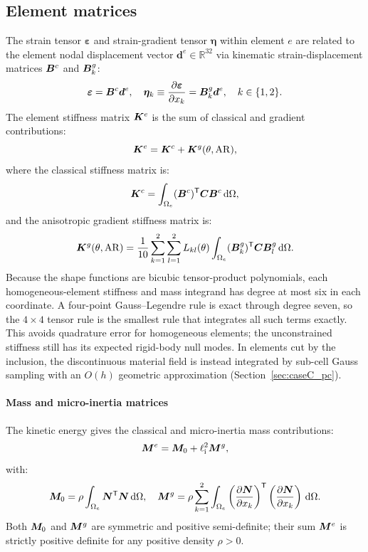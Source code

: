 \subsection{Element matrices}
The strain tensor $\bm\varepsilon$ and strain-gradient tensor $\bm\eta$ within element $e$ are related to the element nodal displacement vector $\bm{d}^e \in \mathbb{R}^{32}$ via kinematic strain-displacement matrices $\bm{B}^c$ and $\bm{B}^g_k$:
\begin{equation}
\bm\varepsilon = \bm{B}^c \bm{d}^e, \quad \bm\eta_k \equiv \frac{\partial \bm\varepsilon}{\partial x_k} = \bm{B}^g_k \bm{d}^e, \quad k \in \{1, 2\}.
\label{eq:strain_matrices}
\end{equation}
The element stiffness matrix $\bm{K}^e$ is the sum of classical and gradient contributions:
\begin{equation}
\bm{K}^e = \bm{K}^c + \bm{K}^g(\theta, \mathrm{AR}),
\label{eq:Ke_total}
\end{equation}
where the classical stiffness matrix is:
\begin{equation}
\bm{K}^c = \int_{\Omega_e} (\bm{B}^c)^\mathsf{T} \bm{C} \bm{B}^c \,\mathrm{d}\Omega,
\label{eq:Kc_int}
\end{equation}
and the anisotropic gradient stiffness matrix is:
\begin{equation}
\bm{K}^g(\theta, \mathrm{AR}) = \frac{1}{10} \sum_{k=1}^2 \sum_{l=1}^2 L_{kl}(\theta) \int_{\Omega_e} (\bm{B}^g_k)^\mathsf{T} \bm{C} \bm{B}^g_l \,\mathrm{d}\Omega.
\label{eq:Kg_int}
\end{equation}
Because the shape functions are bicubic tensor-product polynomials, each homogeneous-element stiffness and mass integrand has degree at most six in each coordinate. A four-point Gauss--Legendre rule is exact through degree seven, so the $4 \times 4$ tensor rule is the smallest rule that integrates all such terms exactly. This avoids quadrature error for homogeneous elements; the unconstrained stiffness still has its expected rigid-body null modes. In elements cut by the inclusion, the discontinuous material field is instead integrated by sub-cell Gauss sampling with an $O(h)$ geometric approximation (Section~\ref{sec:caseC_pc}).

\paragraph{Mass and micro-inertia matrices}
The kinetic energy gives the classical and micro-inertia mass contributions:
\begin{equation}
\bm{M}^e = \bm{M}_0 + \ell_{\mathrm{i}}^2 \bm{M}^g,
\label{eq:Me_total}
\end{equation}
with:
\begin{equation}
\bm{M}_0 = \rho \int_{\Omega_e} \bm{N}^\mathsf{T} \bm{N} \,\mathrm{d}\Omega, \quad \bm{M}^g = \rho \sum_{k=1}^2 \int_{\Omega_e} \left(\frac{\partial \bm{N}}{\partial x_k}\right)^\mathsf{T} \left(\frac{\partial \bm{N}}{\partial x_k}\right) \,\mathrm{d}\Omega.
\label{eq:Mg_int}
\end{equation}
Both $\bm{M}_0$ and $\bm{M}^g$ are symmetric and positive semi-definite; their sum $\bm{M}^e$ is strictly positive definite for any positive density $\rho > 0$.

